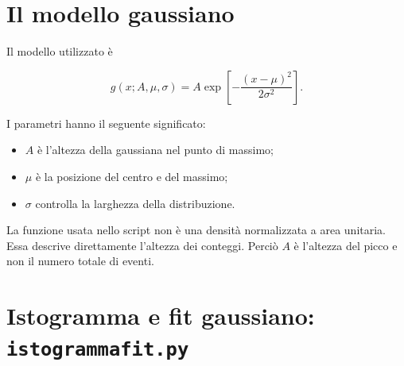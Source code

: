 \documentclass[11pt,a4paper]{book}
\begin{document}
\section{Il modello gaussiano}

Il modello utilizzato è

\[
g(x;A,\mu,\sigma)=
A\exp\left[-\frac{(x-\mu)^2}{2\sigma^2}\right].
\]

I parametri hanno il seguente significato:

\begin{itemize}
    \item $A$ è l'altezza della gaussiana nel punto di massimo;
    \item $\mu$ è la posizione del centro e del massimo;
    \item $\sigma$ controlla la larghezza della distribuzione.
\end{itemize}

La funzione usata nello script non è una densità normalizzata a area
unitaria. Essa descrive direttamente l'altezza dei conteggi. Perciò $A$
è l'altezza del picco e non il numero totale di eventi.

\section{Istogramma e fit gaussiano: \texttt{istogrammafit.py}}
\end{document}
